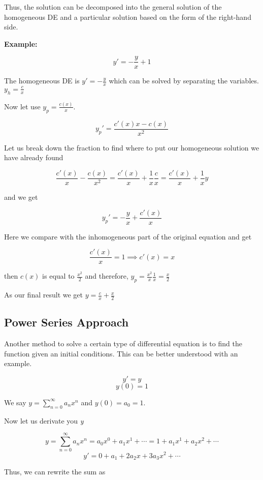 Thus, the solution can be decomposed into the general solution of the homogeneous DE and a 
particular solution based on the form of the right-hand side.
\vspace{\baselineskip}

\textbf{Example: }

\[
    y' = -\frac{y}{x} + 1
\]

The homogeneous DE is \(y' = -\frac{y}{x}\) which can be solved by separating the variables.
\(y_h = \frac{c}{x}\)

Now let use \(y_p = \frac{c(x)}{x}\).

\[
    y_{p}' = \frac{c'(x)x - c(x)}{x^2}
\]

Let us break down the fraction to find where to put our homogeneous solution we have already found

\[
    \frac{c'(x)}{x} - \frac{c(x)}{x^2} = \frac{c'(x)}{x} + \frac{1}{x}\frac{c}{x} 
    = \frac{c'(x)}{x} + \frac{1}{x}y
\]

and we get

\[
    y_{p}' = -\frac{y}{x} + \frac{c'(x)}{x} 
\]

Here we compare with the inhomogeneous part of the original equation and get

\[
    \frac{c'(x)}{x} = 1 \implies c'(x) = x
\]

then \(c(x)\) is equal to \(\frac{x^2}{2}\) and therefore, \(y_p = \frac{x^2}{x}\frac{1}{x} = 
\frac{x}{2}\)
\vspace{\baselineskip}

As our final result we get \(y = \frac{c}{x} + \frac{x}{2}\)

\subsection{Power Series Approach}

Another method to solve a certain type  of differential equation
is to find the function given an initial conditions. This can be better understood with an example.

\[
    y' = y
\]
\[
    y(0) = 1
\]

We say \(y = \sum_{n = 0}^{\infty} a_n x^n\) and \(y(0) = a_0 = 1\).

Now let us derivate you \emph{y}

\[
    y = \sum_{n = 0}^{\infty} a_n x^n = a_0 x^0 + a_1 x^1 + \cdots = 1 + a_1 x^1 + a_2 x^2 + \cdots
\]
\[
    y' = 0  + a_1 + 2 a_2 x + 3 a_3 x^2 + \cdots 
\]

Thus, we can rewrite the sum as 

